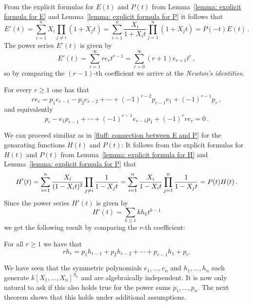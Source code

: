 \begin{fluff}
  \label{fluff: connection between E and P}
  From the explicit formulas for $E(t)$ and $P(t)$ from Lemma~\ref{lemma: explicit formula for E} and Lemma~\ref{lemma: explicit formula for P} it follows that
  \[
      E'(t)
    = \sum_{i=1}^n X_i \prod_{j \neq i} (1 + X_j t)
    = \sum_{i=1}^n \frac{X_i}{1 + X_i t} \prod_{j=1}^n (1 + X_j t)
    = P(-t)E(t) \,.
  \]
  The power series $E'(t)$ is given by
  \[
      E'(t)
    = \sum_{r=1}^\infty r e_r t^{r-1}
    = \sum_{r=0}^\infty (r+1) e_{r+1} t^r \,,
  \]
  so by comparing the $(r-1)$-th coefficient we arrive at the \emph{Newton’s identities}.
\end{fluff}


\begin{corollary}
  \label{corollary: Newtons identities}
  For every $r \geq 1$ one has that
  \[
      r e_r
    =   p_1 e_{r-1}
      - p_2 e_{r-2}
      + \dotsb
      + (-1)^{r-2}  p_{r-1} e_1
      + (-1)^{r-1}  p_r \,,
  \]
  and equivalently
  \[
        p_r
      - e_1 p_{r-1}
      + \dotsb
      + (-1)^{r-1} e_{r-1} p_1
      + (-1)^r r e_r
    = 0 \,.
  \]
\end{corollary}


\begin{fluff}
  We can proceed similiar as in \ref{fluff: connection between E and P} for the genarating functions $H(t)$ and $P(t)$:
  It follows from the explicit formulas for $H(t)$ and $P(t)$ from Lemma~\ref{lemma: explicit formula for H} and Lemma~\ref{lemma: explicit formula for P} that
  \[
      H'(t)
    = \sum_{i=1}^n \frac{X_i}{(1-X_i t)^2} \prod_{j \neq i} \frac{1}{1 - X_j t} \\
    = \sum_{i=1}^n \frac{X_i}{1 - X_i t} \prod_{j=1}^n \frac{1}{1 - X_j t}
    = P(t) H(t) \,.
  \]
  Since the power series $H'(t)$ is given by
  \[
      H'(t)
    = \sum_{k \geq 1} k h_k t^{k-1}
  \]
  we get the following result by comparing the $r$-th coefficient:
\end{fluff}


\begin{corollary}
  \label{corollary: relation between h and p}
  For all $r \geq 1$ we have that
  \[
      r h_r
    =   p_1 h_{r-1}
      + p_2 h_{r-2}
      + \dotsb
      + p_{r-1} h_1
      + p_r.
  \]
\end{corollary}


\begin{fluff}
  We have seen that the symmetric polynomials $e_1, \dotsc, e_n$ and $h_1, \dotsc, h_n$ each generate $k[X_1, \dotsc, X_n]^{S_n}$ and are algebraically independent.
  It is now only natural to ask if this also holds true for the power sums $p_1, \dotsc, p_n$.
  The next theorem shows that this holds under additional assumptions.
\end{fluff}


